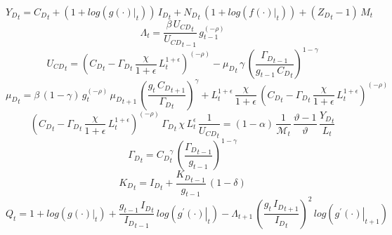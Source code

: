 \documentclass[10pt,a4paper]{article}
\begin{document}
\begin{dmath}
{Y_D}_{t}={C_D}_{t}+\left(1+log\left({\left.       g\left( \cdot \right)            \right|}_{t}\right)\right)\, {I_D}_{t}+{N_D}_{t}\, \left(1+log\left({\left.       f\left( \cdot \right)            \right|}_{t}\right)\right)+\left({Z_D}_{t}-1\right)\, {M}_{t}
\end{dmath}
\begin{dmath}
{\Lambda}_{t}=\frac{\beta\, {U_{CD}}_{t}}{{U_{CD}}_{t-1}}\, {g}_{t-1}^{\left(-\rho\right)}
\end{dmath}
\begin{dmath}
{U_{CD}}_{t}=\left({C_D}_{t}-{\Gamma_D}_{t}\, \frac{\chi}{1+\epsilon}\, {L}_{t}^{1+\epsilon}\right)^{\left(-\rho\right)}-{{\mu}_{D}}_{t}\, \gamma\, \left(\frac{{\Gamma_D}_{t-1}}{{g}_{t-1}\, {C_D}_{t}}\right)^{1-\gamma}
\end{dmath}
\begin{dmath}
{{\mu}_{D}}_{t}=\beta\, \left(1-\gamma\right)\, {g}_{t}^{\left(-\rho\right)}\, {{\mu}_{D}}_{t+1}\, \left(\frac{{g}_{t}\, {C_D}_{t+1}}{{\Gamma_D}_{t}}\right)^{\gamma}+{L}_{t}^{1+\epsilon}\, \frac{\chi}{1+\epsilon}\, \left({C_D}_{t}-{\Gamma_D}_{t}\, \frac{\chi}{1+\epsilon}\, {L}_{t}^{1+\epsilon}\right)^{\left(-\rho\right)}
\end{dmath}
\begin{dmath}
\left({C_D}_{t}-{\Gamma_D}_{t}\, \frac{\chi}{1+\epsilon}\, {L}_{t}^{1+\epsilon}\right)^{\left(-\rho\right)}\, {\Gamma_D}_{t}\, \chi\, {L}_{t}^{\epsilon}\, \frac{1}{{U_{CD}}_{t}}=\left(1-\alpha\right)\, \frac{1}{{\mathcal{M}}_{t}}\, \frac{\vartheta-1}{\vartheta}\, \frac{{Y_D}_{t}}{{L}_{t}}
\end{dmath}
\begin{dmath}
{\Gamma_D}_{t}={C_D}_{t}^{\gamma}\, \left(\frac{{\Gamma_D}_{t-1}}{{g}_{t-1}}\right)^{1-\gamma}
\end{dmath}
\begin{dmath}
{K_D}_{t}={I_D}_{t}+\frac{{K_D}_{t-1}}{{g}_{t-1}}\, \left(1-\delta\right)
\end{dmath}
\begin{dmath}
{Q}_{t}=1+log\left({\left.       g\left( \cdot \right)            \right|}_{t}\right)+\frac{{g}_{t-1}\, {I_D}_{t}}{{I_D}_{t-1}}\, log\left({\left.       g^{\prime}\left( \cdot \right)   \right|}_{t}\right)-{\Lambda}_{t+1}\, \left(\frac{{g}_{t}\, {I_D}_{t+1}}{{I_D}_{t}}\right)^{2}\, log\left({\left.       g^{\prime}\left( \cdot \right)   \right|}_{t+1}\right)
\end{dmath}
\end{document}
